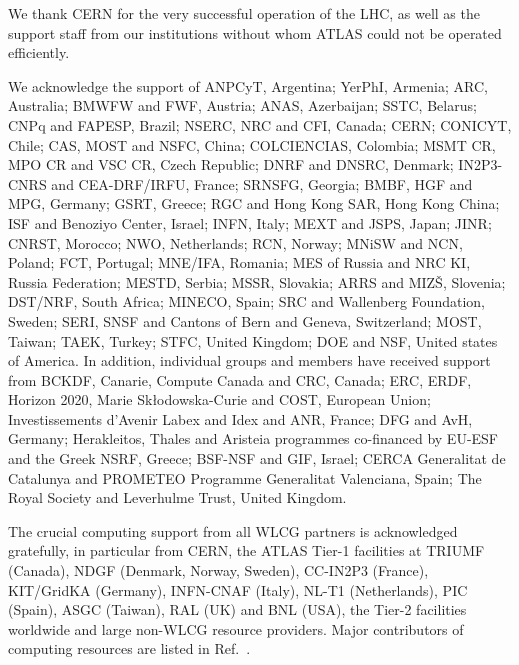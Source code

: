 

We thank CERN for the very successful operation of the LHC, as well as the
support staff from our institutions without whom ATLAS could not be
operated efficiently.

We acknowledge the support of ANPCyT, Argentina; YerPhI, Armenia; ARC, Australia; BMWFW and FWF, Austria; ANAS, Azerbaijan; SSTC, Belarus; CNPq and FAPESP, Brazil; NSERC, NRC and CFI, Canada; CERN; CONICYT, Chile; CAS, MOST and NSFC, China; COLCIENCIAS, Colombia; MSMT CR, MPO CR and VSC CR, Czech Republic; DNRF and DNSRC, Denmark; IN2P3-CNRS and CEA-DRF/IRFU, France; SRNSFG, Georgia; BMBF, HGF and MPG, Germany; GSRT, Greece; RGC and Hong Kong SAR, Hong Kong China; ISF and Benoziyo Center, Israel; INFN, Italy; MEXT and JSPS, Japan; JINR; CNRST, Morocco; NWO, Netherlands; RCN, Norway; MNiSW and NCN, Poland; FCT, Portugal; MNE/IFA, Romania; MES of Russia and NRC KI, Russia Federation; MESTD, Serbia; MSSR, Slovakia; ARRS and MIZ\v{S}, Slovenia; DST/NRF, South Africa; MINECO, Spain; SRC and Wallenberg Foundation, Sweden; SERI, SNSF and Cantons of Bern and Geneva, Switzerland; MOST, Taiwan; TAEK, Turkey; STFC, United Kingdom; DOE and NSF, United states of America. In addition, individual groups and members have received support from BCKDF, Canarie, Compute Canada and CRC, Canada; ERC, ERDF, Horizon 2020, Marie Sk{\l}odowska-Curie and COST, European Union; Investissements d'Avenir Labex and Idex and ANR, France; DFG and AvH, Germany; Herakleitos, Thales and Aristeia programmes co-financed by EU-ESF and the Greek NSRF, Greece; BSF-NSF and GIF, Israel; CERCA Generalitat de Catalunya and PROMETEO Programme Generalitat Valenciana, Spain; The Royal Society and Leverhulme Trust, United Kingdom.

The crucial computing support from all WLCG partners is acknowledged gratefully, in particular from CERN, the ATLAS Tier-1 facilities at TRIUMF (Canada), NDGF (Denmark, Norway, Sweden), CC-IN2P3 (France), KIT/GridKA (Germany), INFN-CNAF (Italy), NL-T1 (Netherlands), PIC (Spain), ASGC (Taiwan), RAL (UK) and BNL (USA), the Tier-2 facilities worldwide and large non-WLCG resource providers. Major contributors of computing resources are listed in Ref.~\cite{ATL-GEN-PUB-2016-002}.

